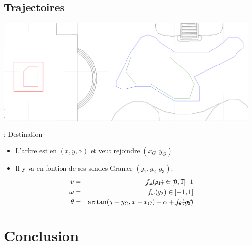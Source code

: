\documentclass[12pt]{beamer}
\begin{document}
        \subsection{Trajectoires}
            \begin{frame}{\subsecname}
                \includegraphics[width=\linewidth]{img/boucles.png}
            \end{frame}
            \begin{frame}{\subsecname: Destination}
                \begin{itemize}
                    \item L’arbre est en $(x, y, \alpha)$ et veut rejoindre $(x_G, y_G)$
                    \item Il y va en fontion de ses sondes Granier $(g_1, g_2, g_3)$:
                        \begin{eqnarray*}
                            v &=& \cancel{f_v(g_1) \in [0, 1]} ~~ 1 \\
                            \omega &=& f_\omega(g_2) \in [-1, 1] \\
                            \theta &=& \arctan(y - y_G, x - x_G) - \alpha + \cancel{f_\theta(g_3)}
                        \end{eqnarray*}
                \end{itemize}
            \end{frame}
    \section{Conclusion}
\end{document}

